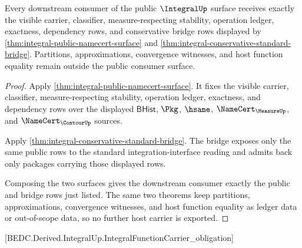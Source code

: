 \begin{theorem}\label{thm:integral-mature-consumer-completeness}
Every downstream consumer of the public $\IntegralUp$ surface receives exactly
the visible carrier, classifier, measure-respecting stability, operation
ledger, exactness, dependency rows, and conservative bridge rows displayed by
\autoref{thm:integral-public-namecert-surface} and
\autoref{thm:integral-conservative-standard-bridge}. Partitions,
approximations, convergence witnesses, and host function equality remain
outside the public consumer surface.
\end{theorem}
\begin{proof}
Apply \autoref{thm:integral-public-namecert-surface}. It fixes the visible
carrier, classifier, measure-respecting stability, operation ledger,
exactness, and dependency rows over the displayed $\mathsf{BHist}$, $\Pkg$,
$\hsame$, $\NameCert_{\MeasureUp}$, and $\NameCert_{\ContourUp}$ sources.

Apply \autoref{thm:integral-conservative-standard-bridge}. The bridge exposes
only the same public rows to the standard integration-interface reading and
admits back only packages carrying those displayed rows.

Composing the two surfaces gives the downstream consumer exactly the public
and bridge rows just listed. The same two theorems keep partitions,
approximations, convergence witnesses, and host function equality as ledger
data or out-of-scope data, so no further host carrier is exported.
\end{proof}

[BEDC.Derived.IntegralUp.IntegralFunctionCarrier\_obligation]

